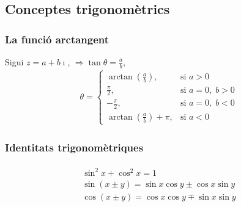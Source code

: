 \subsection{Conceptes trigonomètrics}
\subsubsection*{La funció arctangent}
Sigui $z = a + b \imath$, $\Rightarrow \tan \theta = \frac{a}{b}$, 
\begin{align}
    \theta =
    \begin{cases}
        \arctan \left( \frac{a}{b} \right) , & \text{si } a > 0 \\
        \frac{\pi}{2} , & \text{si } a=0, \; b>0 \\ 
        - \frac{\pi}{2} , & \text{si } a=0, \; b<0 \\
        \arctan \left( \frac{a}{b} \right) + \pi , & \text{si } a < 0
    \end{cases} 
\end{align}

\subsubsection*{Identitats trigonomètriques}
\begin{align}
\begin{gathered}
    \sin ^{2} x + \cos ^{2} x = 1 \\
    \sin (x \pm y) = \sin x \cos y \pm \cos x \sin y \\
    \cos (x \pm y) = \cos x \cos y \mp \sin x \sin y
\end{gathered}
\end{align}